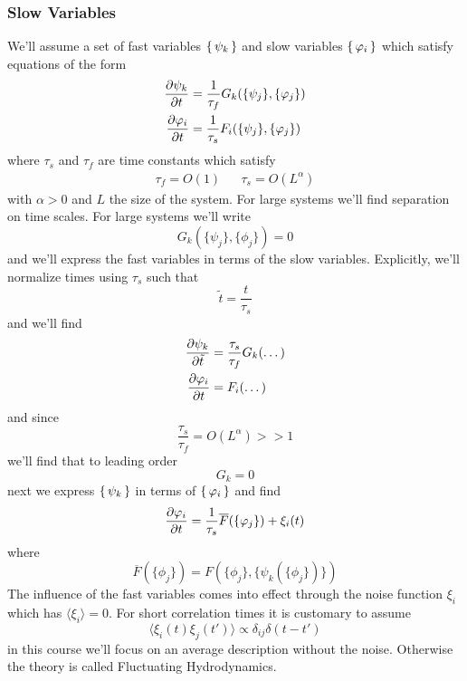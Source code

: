 \subsubsection{Slow Variables}
We'll assume a set of fast variables \(\set{\psi_k}\) and slow variables \(\set{\varphi_i}\) which satisfy equations of the form
\begin{align}
	\diffp{\psi_k}{t} &= \frac{1}{\tau_f}G_k(\{\psi_j\}, \{\phi_j\})\\
	\diffp{\phi_i}{t} &= \frac{1}{\tau_s}F_i(\{\psi_j\},\{\phi_j\})
\end{align}
where \(\tau_s\) and \(\tau_f\) are time constants which satisfy
\begin{align}
	\tau_f = O(1) && \tau_s = O(L^\alpha)
\end{align}
with \(\alpha>0\) and \(L\) the size of the system. For large systems we'll find separation on time scales. For large systems we'll write
\begin{equation}
	G_k(\{\psi_j\}, \{\phi_j\}) = 0
\end{equation}
and we'll express the fast variables in terms of the slow variables. Explicitly, we'll normalize times using \(\tau_s\) such that
\begin{equation}
	\tilde t = \frac{t}{\tau_s}
\end{equation}
and we'll find
\begin{align}
	\diffp{\psi_k}{\tilde t} &= \frac{\tau_s}{\tau_f}G_k(\dots)\\
	\diffp{\phi_i}{t} &= F_i(\dots)
\end{align}
and since
\begin{equation}
	\frac{\tau_s}{\tau_f} = O(L^\alpha)>>1
\end{equation}
we'll find that to leading order
\begin{equation}
	G_k=0
\end{equation}
next we express \(\set{\psi_k} \) in terms of \(\set{\varphi_i} \) and find
\begin{equation}
	\diffp{\phi_i}{t} = \frac{1}{\tau_s}\overline{F}(\{\phi_j\}) + \xi_i(t)
\end{equation}
where
\begin{equation}
	\overline{F}(\{\phi_j\}) = F(\{\phi_j\}, \{\psi_k(\{\phi_j\})\})
\end{equation}
The influence of the fast variables comes into effect through the noise function \(\xi_i\) which has \(\langle\xi_i\rangle=0\). For short correlation times it is customary to assume
\begin{equation}
	\langle\xi_i(t)\xi_j(t')\rangle \propto \delta_{ij}\delta(t-t')
\end{equation}
in this course we'll focus on an average description without the noise. Otherwise the theory is called Fluctuating Hydrodynamics.
